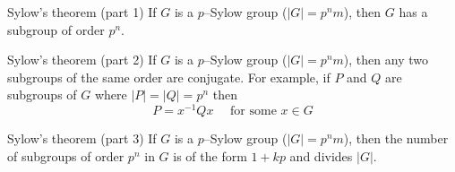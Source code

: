 \documentclass[avery5371,grid]{flashcards}
\begin{document}
\begin{flashcard}[Theorem]{Sylow's theorem (part 1)}
If $G$ is a $p$--Sylow group ($|G| = p^{n}m$),
then $G$ has a subgroup of order $p^{n}$.
\end{flashcard}

\begin{flashcard}[Theorem]{Sylow's theorem (part 2)}
If $G$ is a $p$--Sylow group ($|G| = p^{n}m$), then any 
two subgroups of the same order are conjugate.  For example,
if $P$ and $Q$ are subgroups of $G$ where $|P|=|Q|=p^{n}$ then
\begin{equation*}
P = x^{-1}Qx \quad \text{ for some } x \in G
\end{equation*}
\end{flashcard}

\begin{flashcard}[Theorem]{Sylow's theorem (part 3)}
If $G$ is a $p$--Sylow group ($|G| = p^{n}m$),
then the number of subgroups of order $p^{n}$ in $G$ is
of the form $1 + kp$ and divides $|G|$.
\end{flashcard}

\end{document}
